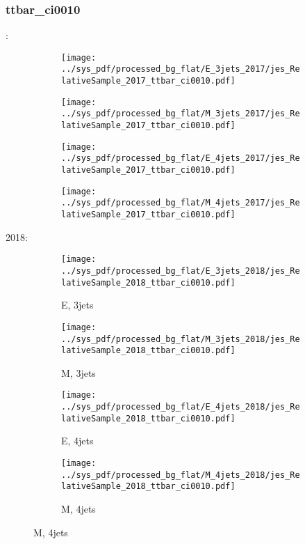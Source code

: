 \documentclass{beamer}
\begin{document}
\begin{frame}
\frametitle{ttbar_ci0010}
\fontsize{5}{1}:
\begin{figure}
\centering
\begin{subfigure}[b]{0.24\textwidth}
\texttt{[image: ../sys\_pdf/processed\_bg\_flat/E\_3jets\_2017/jes\_RelativeSample\_2017\_ttbar\_ci0010.pdf]}
\end{subfigure}
\begin{subfigure}[b]{0.24\textwidth}
\texttt{[image: ../sys\_pdf/processed\_bg\_flat/M\_3jets\_2017/jes\_RelativeSample\_2017\_ttbar\_ci0010.pdf]}
\end{subfigure}
\begin{subfigure}[b]{0.24\textwidth}
\texttt{[image: ../sys\_pdf/processed\_bg\_flat/E\_4jets\_2017/jes\_RelativeSample\_2017\_ttbar\_ci0010.pdf]}
\end{subfigure}
\begin{subfigure}[b]{0.24\textwidth}
\texttt{[image: ../sys\_pdf/processed\_bg\_flat/M\_4jets\_2017/jes\_RelativeSample\_2017\_ttbar\_ci0010.pdf]}
\end{subfigure}
\end{figure}
2018:
\begin{figure}
\centering
\begin{subfigure}[b]{0.24\textwidth}
\texttt{[image: ../sys\_pdf/processed\_bg\_flat/E\_3jets\_2018/jes\_RelativeSample\_2018\_ttbar\_ci0010.pdf]}
\captionsetup{font=tiny}
\caption{E, 3jets}
\end{subfigure}
\begin{subfigure}[b]{0.24\textwidth}
\texttt{[image: ../sys\_pdf/processed\_bg\_flat/M\_3jets\_2018/jes\_RelativeSample\_2018\_ttbar\_ci0010.pdf]}
\captionsetup{font=tiny}
\caption{M, 3jets}
\end{subfigure}
\begin{subfigure}[b]{0.24\textwidth}
\texttt{[image: ../sys\_pdf/processed\_bg\_flat/E\_4jets\_2018/jes\_RelativeSample\_2018\_ttbar\_ci0010.pdf]}
\captionsetup{font=tiny}
\caption{E, 4jets}
\end{subfigure}
\begin{subfigure}[b]{0.24\textwidth}
\texttt{[image: ../sys\_pdf/processed\_bg\_flat/M\_4jets\_2018/jes\_RelativeSample\_2018\_ttbar\_ci0010.pdf]}
\captionsetup{font=tiny}
\caption{M, 4jets}
\end{subfigure}
\end{figure}
\end{frame}
\end{document}
